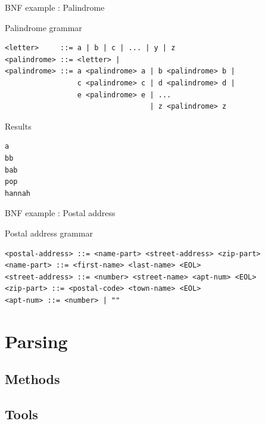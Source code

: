 \documentclass{beamer}
\begin{document}
\begin{frame}[fragile]{BNF example : Palindrome}

\begin{exampleblock}{Palindrome grammar}
\begin{verbatim}
<letter>     ::= a | b | c | ... | y | z
<palindrome> ::= <letter> |
<palindrome> ::= a <palindrome> a | b <palindrome> b |
                 c <palindrome> c | d <palindrome> d | 
                 e <palindrome> e | ...
                                  | z <palindrome> z
\end{verbatim}
\end{exampleblock}

\begin{exampleblock}{Results}
\begin{verbatim}
a
bb
bab
pop
hannah
\end{verbatim}
\end{exampleblock}

\end{frame}

\begin{frame}[fragile]{BNF example : Postal address}
\begin{exampleblock}{Postal address grammar}\small
\begin{verbatim}
<postal-address> ::= <name-part> <street-address> <zip-part>
<name-part> ::= <first-name> <last-name> <EOL> 
<street-address> ::= <number> <street-name> <apt-num> <EOL>
<zip-part> ::= <postal-code> <town-name> <EOL>
<apt-num> ::= <number> | ""
\end{verbatim}
\end{exampleblock}
\end{frame}


\section{Parsing}

\subsection{Methods}

\subsection{Tools}


\end{document}
